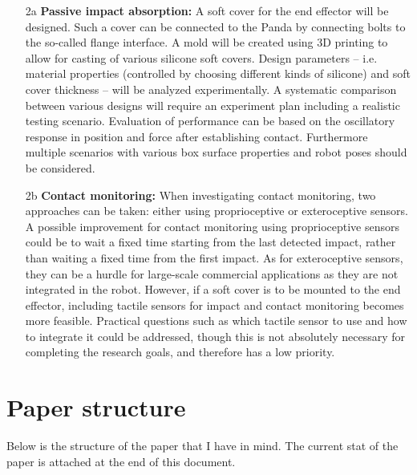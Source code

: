 \documentclass[11pt]{report}
\numberwithin{equation}{section}        %
\numberwithin{figure}{section}          %
\numberwithin{table}{section}           %
\begin{document}
\begin{enumerate}
   \item[2a] \textbf{Passive impact absorption:} A soft cover for the end effector will be designed. Such a cover can be connected to the Panda by connecting bolts to the so-called flange interface. A mold will be created using 3D printing to allow for casting of various silicone soft covers. Design parameters -- i.e. material properties (controlled by choosing different kinds of silicone) and soft cover thickness -- will be analyzed experimentally. A systematic comparison between various designs will require an experiment plan including a realistic testing scenario. Evaluation of performance can be based on the oscillatory response in position and force after establishing contact. Furthermore multiple scenarios with various box surface properties and robot poses should be considered.
  
  \item[2b] \textbf{Contact monitoring:} When investigating contact monitoring, two approaches can be taken: either using proprioceptive or exteroceptive sensors. A possible improvement for contact monitoring using proprioceptive sensors could be to wait a fixed time starting from the last detected impact, rather than waiting a fixed time from the first impact. As for exteroceptive sensors, they can be a hurdle for large-scale commercial applications as they are not integrated in the robot. However, if a soft cover is to be mounted to the end effector, including tactile sensors for impact and contact monitoring becomes more feasible. Practical questions such as which tactile sensor to use and how to integrate it could be addressed, though this is not absolutely necessary for completing the research goals, and therefore has a low priority.
  \end{enumerate}
\newpage
  \section{Paper structure}\label{sec:1}
  Below is the structure of the paper that I have in mind. The current stat of the paper is attached at the end of this document.
\end{document}

